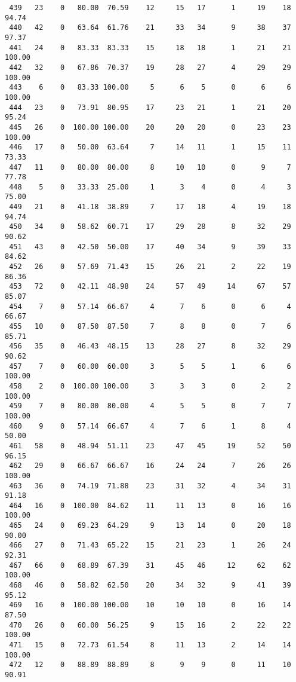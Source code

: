 \begin{verbatim}
 439   23    0   80.00  70.59    12     15   17      1     19    18    94.74
 440   42    0   63.64  61.76    21     33   34      9     38    37    97.37
 441   24    0   83.33  83.33    15     18   18      1     21    21   100.00
 442   32    0   67.86  70.37    19     28   27      4     29    29   100.00
 443    6    0   83.33 100.00     5      6    5      0      6     6   100.00
 444   23    0   73.91  80.95    17     23   21      1     21    20    95.24
 445   26    0  100.00 100.00    20     20   20      0     23    23   100.00
 446   17    0   50.00  63.64     7     14   11      1     15    11    73.33
 447   11    0   80.00  80.00     8     10   10      0      9     7    77.78
 448    5    0   33.33  25.00     1      3    4      0      4     3    75.00
 449   21    0   41.18  38.89     7     17   18      4     19    18    94.74
 450   34    0   58.62  60.71    17     29   28      8     32    29    90.62
 451   43    0   42.50  50.00    17     40   34      9     39    33    84.62
 452   26    0   57.69  71.43    15     26   21      2     22    19    86.36
 453   72    0   42.11  48.98    24     57   49     14     67    57    85.07
 454    7    0   57.14  66.67     4      7    6      0      6     4    66.67
 455   10    0   87.50  87.50     7      8    8      0      7     6    85.71
 456   35    0   46.43  48.15    13     28   27      8     32    29    90.62
 457    7    0   60.00  60.00     3      5    5      1      6     6   100.00
 458    2    0  100.00 100.00     3      3    3      0      2     2   100.00
 459    7    0   80.00  80.00     4      5    5      0      7     7   100.00
 460    9    0   57.14  66.67     4      7    6      1      8     4    50.00
 461   58    0   48.94  51.11    23     47   45     19     52    50    96.15
 462   29    0   66.67  66.67    16     24   24      7     26    26   100.00
 463   36    0   74.19  71.88    23     31   32      4     34    31    91.18
 464   16    0  100.00  84.62    11     11   13      0     16    16   100.00
 465   24    0   69.23  64.29     9     13   14      0     20    18    90.00
 466   27    0   71.43  65.22    15     21   23      1     26    24    92.31
 467   66    0   68.89  67.39    31     45   46     12     62    62   100.00
 468   46    0   58.82  62.50    20     34   32      9     41    39    95.12
 469   16    0  100.00 100.00    10     10   10      0     16    14    87.50
 470   26    0   60.00  56.25     9     15   16      2     22    22   100.00
 471   15    0   72.73  61.54     8     11   13      2     14    14   100.00
 472   12    0   88.89  88.89     8      9    9      0     11    10    90.91

\end{verbatim}
